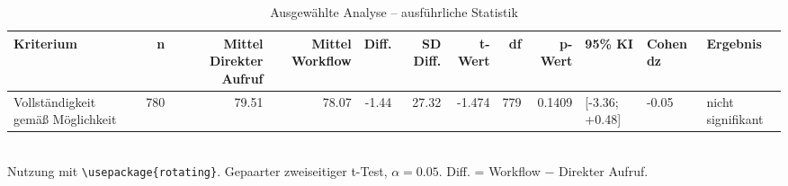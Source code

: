 \begin{table}
\centering
\caption{Ausgewählte Analyse -- ausführliche Statistik}
\begin{tabular}{lrrrrrrrrlll}
\toprule
Kriterium & n & Mittel Direkter Aufruf & Mittel Workflow & Diff. & SD Diff. & t-Wert & df & p-Wert & 95\% KI & Cohen dz & Ergebnis \\
\midrule
Vollständigkeit gemäß Möglichkeit & 780 & 79.51 & 78.07 & -1.44 & 27.32 & -1.474 & 779 & 0.1409 & [-3.36; +0.48] & -0.05 & nicht signifikant \\
\bottomrule
\end{tabular}
\\[2mm]
\footnotesize Nutzung mit \texttt{\textbackslash usepackage\{rotating\}}. Gepaarter zweiseitiger t-Test, $\alpha=0.05$. Diff. = Workflow $-$ Direkter Aufruf.
\end{table}
